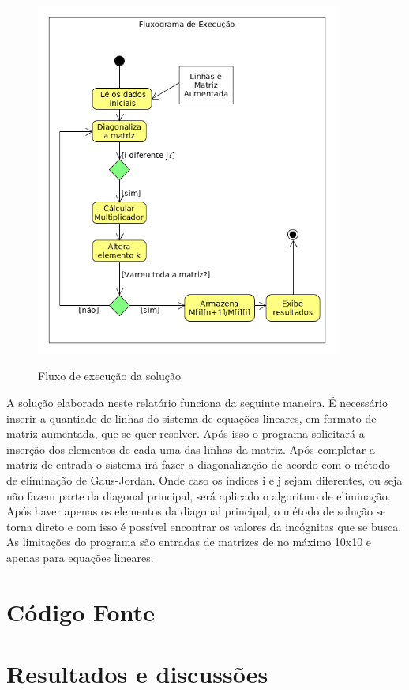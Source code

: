 \documentclass[12pt, hidelinks]{article}
\begin{document}
\begin{figure}[!h]
  \centering
  \includegraphics[width=10cm]{figuras/fluxograma.png}\\
  \caption{Fluxo de execução da solução}\label{fig:fluxo}
\end{figure}

A solução elaborada neste relatório funciona da seguinte maneira. É necessário inserir a quantiade de linhas
do sistema de equações lineares, em formato de matriz aumentada, que se quer resolver. Após isso o programa
solicitará a inserção dos elementos de cada uma das linhas da matriz. Após completar a matriz de entrada o
sistema irá fazer a diagonalização de acordo com o método de eliminação de Gaus-Jordan. Onde caso os índices
i e j sejam diferentes, ou seja não fazem parte da diagonal principal, será aplicado o algoritmo de eliminação.
Após haver apenas os elementos da diagonal principal, o método de solução se torna direto e com isso é possível
encontrar os valores da incógnitas que se busca. As limitações do programa são entradas de matrizes de no máximo
10x10 e apenas para equações lineares.

\newpage
\section{Código Fonte}



\newpage
\section{Resultados e discussões}
\end{document}

